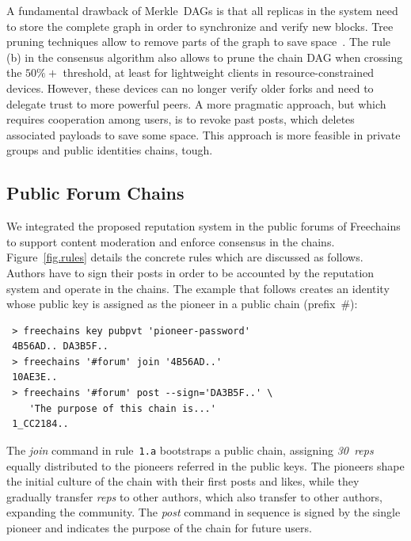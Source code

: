 \documentclass[10pt,journal,compsoc]{IEEEtran}
\newcommand{\FC}       {Freechains\xspace}
\newcommand{\reps}     {\emph{reps}\xspace}
\newcommand{\nreps}[1] {\emph{#1~reps\xspace}}
\begin{document}
A fundamental drawback of Merkle~DAGs is that all replicas in the system need
to store the complete graph in order to synchronize and verify new blocks.
Tree pruning techniques allow to remove parts of the graph to save
space~\cite{p2p.prune}.
The rule (b) in the consensus algorithm also allows to prune the chain DAG when
crossing the $50\%+$ threshold, at least for lightweight clients in
resource-constrained devices.
However, these devices can no longer verify older forks and need to delegate
trust to more powerful peers.
%
A more pragmatic approach, but which requires cooperation among users, is to
revoke past posts, which deletes associated payloads to save some space.
This approach is more feasible in private groups and public identities chains,
tough.

\subsection{Public Forum Chains}
\label{sec.consensus.chains}

We integrated the proposed reputation system in the public forums of \FC to
support content moderation and enforce consensus in the chains.
Figure~\ref{fig.rules} details the concrete rules which are discussed as
follows.
Authors have to sign their posts in order to be accounted by the reputation
system and operate in the chains.
The example that follows creates an identity whose public key is assigned as
the pioneer in a public chain (prefix~$\#$):

{\footnotesize
\begin{verbatim}
 > freechains key pubpvt 'pioneer-password'
 4B56AD.. DA3B5F..
 > freechains '#forum' join '4B56AD..'
 10AE3E..
 > freechains '#forum' post --sign='DA3B5F..' \
    'The purpose of this chain is...'
 1_CC2184..
\end{verbatim}
}

The \emph{join} command in rule~\texttt{1.a} bootstraps a public chain,
assigning \nreps{30} equally distributed to the pioneers referred in the public
keys.
The pioneers shape the initial culture of the chain with their first posts and
likes, while they gradually transfer \reps to other authors, which also
transfer to other authors, expanding the community.
%
The \emph{post} command in sequence is signed by the single pioneer and
indicates the purpose of the chain for future users.
\end{document}
